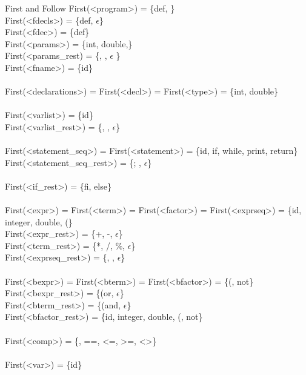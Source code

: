 \documentclass{article}
\begin{document}
\newpage
\noindent
First and Follow
\noindent
First(<program>) = \{def, \} \\
First(<fdecls>) = \{def, $\epsilon$\}\\
First(<fdec>) = \{def\}\\
First(<params>) = \{int, double,\}\\
First(<params\_rest) = \{, , $\epsilon$ \}\\
First(<fname>) = \{id\}\\
\\
First(<declarations>) = First(<decl>)  = First(<type>) = \{int, double\}\\
\\
First(<varlist>) = \{id\}\\
First(<varlist\_rest>) = \{, , $\epsilon$\}\\
\\
First(<statement\_seq>) = First(<statement>) = \{id, if, while, print, return\}\\
First(<statement\_seq\_rest>) = \{; , $\epsilon$\}\\
\\
First(<if\_rest>) = \{fi, else\}\\
\\
First(<expr>) = First(<term>) = First(<factor>) = First(<exprseq>) = \{id, integer, double, (\}\\
First(<expr\_rest>) = \{+, -, $\epsilon$\}\\
First(<term\_rest>) = \{*, /, \%, $\epsilon$\}\\
First(<exprseq\_rest>) = \{, , $\epsilon$\}\\
\\
First(<bexpr>) = First(<bterm>) = First(<bfactor>) = \{(, not\}\\
First(<bexpr\_rest>) = \{(or, $\epsilon$\}\\
First(<bterm\_rest>) = \{(and, $\epsilon$\}\\
First(<bfactor\_rest>) = \{id, integer, double, (, not\}\\
\\
First(<comp>) = \{<, >, ==, <=, >=, <>\}\\
\\
First(<var>) = \{id\}\\
\end{document}
